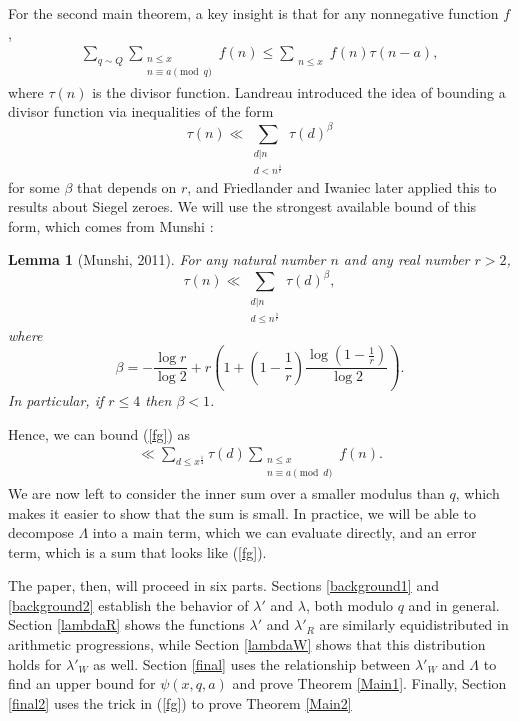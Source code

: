 \documentclass{amsart}
\newtheorem{lemma}[theorem]{Lemma}
\begin{document}
For the second main theorem, a key insight is that for any nonnegative function $f$,
\begin{gather}\label{fg}
\sum_{q\sim Q}\mathop{\sum}\limits_{\substack{n\leq x \\ n\equiv a\pmod q}}f(n)\leq \mathop{\sum}\limits_{\substack{n\leq x }}f(n)\tau(n-a),
\end{gather}
where $\tau(n)$ is the divisor function.  Landreau \cite{Land} introduced the idea of bounding a divisor function via inequalities of the form
$$\tau(n)\ll \sum_{\substack{d|n \\ d<n^\frac 1r}}\tau(d)^{\beta}$$
for some $\beta$ that depends on $r$, and Friedlander and Iwaniec \cite{FI03} later applied this to results about Siegel zeroes.  We will use the strongest available bound of this form, which comes from Munshi \cite{Mu}:
\begin{lemma}[Munshi, 2011]\label{Mun}
For any natural number $n$ and any real number $r>2$,
$$\tau(n)\ll \sum_{\substack{d|n \\ d\leq n^\frac 1r}}\tau(d)^\beta,$$
where
$$\beta=-\frac{\log r}{\log 2}+r\left(1+\left(1-\frac 1r\right)\frac{\log\left(1-\frac 1r\right)}{\log 2}\right).$$
In particular, if $r\leq 4$ then $\beta<1$.
\end{lemma}

Hence, we can bound (\ref{fg}) as
\begin{gather}
\ll \sum_{d\leq x^\frac 14}\tau(d)\mathop{\sum}\limits_{\substack{n\leq x \\ n\equiv a\pmod d}}f(n).
\end{gather}
We are now left to consider the inner sum over a smaller modulus than $q$, which makes it easier to show that the sum is small.  In practice, we will be able to decompose $\Lambda$ into a main term, which we can evaluate directly, and an error term, which is a sum that looks like (\ref{fg}).

The paper, then, will proceed in six parts.  Sections \ref{background1} and \ref{background2} establish the behavior of $\lambda'$ and $\lambda$, both modulo $q$ and in general.  Section \ref{lambdaR} shows the functions $\lambda'$ and $\lambda'_R$ are similarly equidistributed in arithmetic progressions, while Section \ref{lambdaW} shows that this distribution holds for $\lambda'_W$ as well.  Section \ref{final} uses the relationship between $\lambda'_W$ and $\Lambda$ to find an upper bound for $\psi(x,q,a)$ and prove Theorem \ref{Main1}.  Finally, Section \ref{final2} uses the trick in (\ref{fg}) to prove Theorem \ref{Main2}
\end{document}
